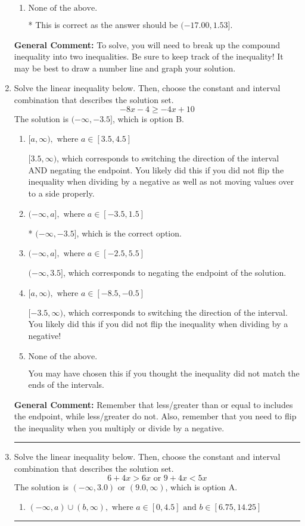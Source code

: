 \documentclass{extbook}[14pt]
\newcommand{\litem}[1]{\item #1

\rule{\textwidth}{0.4pt}}
\begin{document}
\begin{enumerate}
{\begin{enumerate}[label=\Alph*.]
$(17.00, -1.53]$, which is the correct interval but negatives of the actual endpoints.
\item \( \text{None of the above.} \)

* This is correct as the answer should be $(-17.00, 1.53]$.
\end{enumerate}

\textbf{General Comment:} To solve, you will need to break up the compound inequality into two inequalities. Be sure to keep track of the inequality! It may be best to draw a number line and graph your solution.
}
\litem{
Solve the linear inequality below. Then, choose the constant and interval combination that describes the solution set.
\[ -8x -4 \geq -4x + 10 \]The solution is \( (-\infty, -3.5] \), which is option B.\begin{enumerate}[label=\Alph*.]
\item \( [a, \infty), \text{ where } a \in [3.5, 4.5] \)

 $[3.5, \infty)$, which corresponds to switching the direction of the interval AND negating the endpoint. You likely did this if you did not flip the inequality when dividing by a negative as well as not moving values over to a side properly.
\item \( (-\infty, a], \text{ where } a \in [-3.5, 1.5] \)

* $(-\infty, -3.5]$, which is the correct option.
\item \( (-\infty, a], \text{ where } a \in [-2.5, 5.5] \)

 $(-\infty, 3.5]$, which corresponds to negating the endpoint of the solution.
\item \( [a, \infty), \text{ where } a \in [-8.5, -0.5] \)

 $[-3.5, \infty)$, which corresponds to switching the direction of the interval. You likely did this if you did not flip the inequality when dividing by a negative!
\item \( \text{None of the above}. \)

You may have chosen this if you thought the inequality did not match the ends of the intervals.
\end{enumerate}

\textbf{General Comment:} Remember that less/greater than or equal to includes the endpoint, while less/greater do not. Also, remember that you need to flip the inequality when you multiply or divide by a negative.
}
\litem{
Solve the linear inequality below. Then, choose the constant and interval combination that describes the solution set.
\[ 6 + 4 x > 6 x \text{ or } 9 + 4 x < 5 x \]The solution is \( (-\infty, 3.0) \text{ or } (9.0, \infty) \), which is option A.\begin{enumerate}[label=\Alph*.]
\item \( (-\infty, a) \cup (b, \infty), \text{ where } a \in [0, 4.5] \text{ and } b \in [6.75, 14.25] \)


\end{enumerate}}
\end{enumerate}
\end{document}
